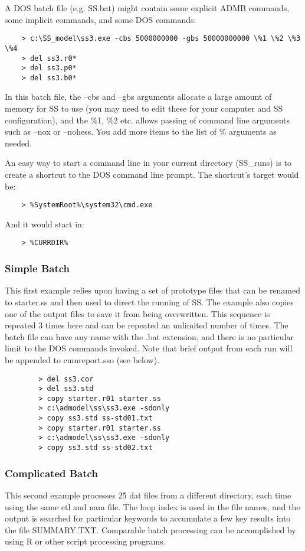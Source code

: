 A DOS batch file (e.g. SS.bat) might contain some explicit ADMB commands, some implicit commands, and some DOS commands:

\begin{verbatim}
	> c:\SS_model\ss3.exe -cbs 5000000000 -gbs 50000000000 \%1 \%2 \%3 \%4 
	> del ss3.r0*
	> del ss3.p0*
	> del ss3.b0*
\end{verbatim}

In this batch file, the –cbs and –gbs arguments allocate a large amount of memory for SS to use (you may need to edit these for your computer and SS configuration), and the \%1, \%2 etc. allows passing of command line arguments such as –nox or –nohess.  You add more items to the list of \% arguments as needed.

An easy way to start a command line in your current directory (SS\_runs) is to create a shortcut to the DOS command line prompt.  The shortcut’s target would be:

\begin{verbatim}
	> %SystemRoot%\system32\cmd.exe
\end{verbatim}

\noindent And it would start in: 
\begin{verbatim}
	> %CURRDIR%
\end{verbatim}

\subsubsection{Simple Batch}
This first example relies upon having a set of prototype files that can be renamed to starter.ss and then used to direct the running of SS.  The example also copies one of the output files to save it from being overwritten.  This sequence is repeated 3 times here and can be repeated an unlimited number of times.  The batch file can have any name with the .bat extension, and there is no particular limit to the DOS commands invoked.  Note that brief output from each run will be appended to cumreport.sso (see below).

\begin{verbatim}
		> del ss3.cor
		> del ss3.std
		> copy starter.r01 starter.ss
		> c:\admodel\ss\ss3.exe -sdonly
		> copy ss3.std ss-std01.txt
		> copy starter.r01 starter.ss
		> c:\admodel\ss\ss3.exe -sdonly
		> copy ss3.std ss-std02.txt
\end{verbatim}

\subsubsection{Complicated Batch}
This second example processes 25 dat files from a different directory, each time using the same ctl and nam file.  The loop index is used in the file names, and the output is searched for particular keywords to accumulate a few key results into the file SUMMARY.TXT.  Comparable batch processing can be accomplished by using R or other script processing programs.

